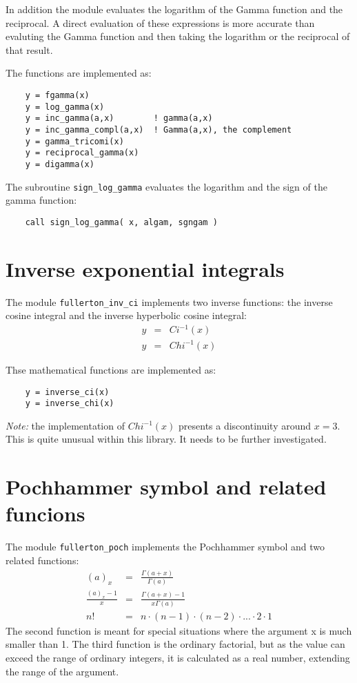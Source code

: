 \documentclass{article}
\begin{document}
In addition the module evaluates the logarithm of the Gamma function and the reciprocal. A direct evaluation
of these expressions is more accurate than evaluting the Gamma function and then taking the logarithm or the reciprocal
of that result.

The functions are implemented as:
\begin{verbatim}
    y = fgamma(x)
    y = log_gamma(x)
    y = inc_gamma(a,x)        ! gamma(a,x)
    y = inc_gamma_compl(a,x)  ! Gamma(a,x), the complement
    y = gamma_tricomi(x)
    y = reciprocal_gamma(x)
    y = digamma(x)
\end{verbatim}

The subroutine \verb+sign_log_gamma+ evaluates the logarithm and the sign of the gamma function:
\begin{verbatim}
    call sign_log_gamma( x, algam, sgngam )
\end{verbatim}


\section{Inverse exponential integrals}
The module \verb+fullerton_inv_ci+ implements two inverse functions: the inverse cosine integral
and the inverse hyperbolic cosine integral:
\begin{eqnarray}
    y &=& Ci^{-1}(x) \\
    y &=& Chi^{-1}(x)
\end{eqnarray}

Thse mathematical functions are implemented as:
\begin{verbatim}
    y = inverse_ci(x)
    y = inverse_chi(x)
\end{verbatim}

\emph{Note:} the implementation of $Chi^{-1}(x)$ presents a discontinuity around $x = 3$. This is
quite unusual within this library. It needs to be further investigated.

\section{Pochhammer symbol and related funcions}
The module \verb+fullerton_poch+ implements the Pochhammer symbol and two related functions:
\begin{eqnarray}
    (a)_x             &=& \frac{\Gamma(a+x)}{\Gamma(a)} \\
    \frac{(a)_x-1}{x} &=& \frac{\Gamma(a+x)-1}{ x \Gamma(a)} \\
    n!                &=& n \cdot (n-1) \cdot (n-2) \cdot ... \cdot 2 \cdot 1
\end{eqnarray}
The second function is meant for special situations where the argument x is much smaller than 1.
The third function is the ordinary factorial, but as the value can exceed the range of ordinary integers,
it is calculated as a real number, extending the range of the argument.
\end{document}
